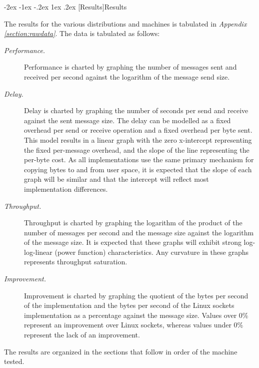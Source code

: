 \documentclass[letterpaper,final,notitlepage,twocolumn,10pt,twoside]{article}
\makeatletter
\renewcommand\section{\@startsection {section}{1}{\z@}%
                                   {-2ex \@plus -1ex \@minus -.2ex}%
                                   {1ex \@plus .2ex}%
                                   {\normalfont\large\bfseries}}
\makeatother
\begin{document}
\section[Results]{Results}

The results for the various distributions and machines is tabulated in \textit{Appendix
\ref{section:rawdata}}.  The data is tabulated as follows:

\begin{description}

\item[{\it Performance.}]

Performance is charted by graphing the number of messages sent and received per second against the
logarithm of the message send size.

\item[{\it Delay.}]

Delay is charted by graphing the number of seconds per send and receive against the sent message
size.  The delay can be modelled as a fixed overhead per send or receive operation and a fixed
overhead per byte sent.  This model results in a linear graph with the zero x-intercept representing
the fixed per-message overhead, and the slope of the line representing the per-byte cost.  As all
implementations use the same primary mechanism for copying bytes to and from user space, it is
expected that the slope of each graph will be similar and that the intercept will reflect most
implementation differences.

\item[{\it Throughput.}]

Throughput is charted by graphing the logarithm of the product of the number of messages per second
and the message size against the logarithm of the message size.  It is expected that these graphs
will exhibit strong log-log-linear (power function) characteristics.  Any curvature in these graphs
represents throughput saturation.

\item[{\it Improvement.}]

Improvement is charted by graphing the quotient of the bytes per second of the implementation and
the bytes per second of the Linux sockets implementation as a percentage against the message size.
Values over 0\% represent an improvement over Linux sockets, whereas values under 0\% represent the
lack of an improvement.

\end{description}

The results are organized in the sections that follow in order of the machine tested.
\end{document}

